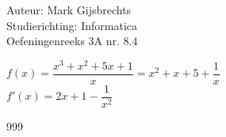 \documentclass[a4paper]{article}
\begin{document}
\noindent \large Auteur: Mark Gijsbrechts \\
\noindent \large Studierichting: Informatica\\
\noindent \large Oefeningenreeks 3A nr. 8.4\\

\medskip

\normalsize





$f(x) = \dfrac{x^3 + x^2 + 5x + 1}{x} = x^2 + x + 5 + \dfrac{1}{x}$ \\

$f'(x) = 2x + 1 - \dfrac{1}{x^2} $


\begin{thebibliography}{999}
\end{thebibliography}
\end{document}
